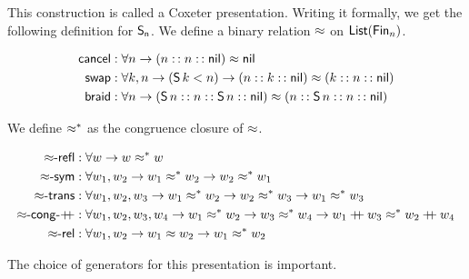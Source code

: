 
This construction is called a Coxeter presentation. Writing it formally, we get
the following definition for $\Sn$. We define a binary relation $\cox$ on
$\List[\Fin[n]]$.

\begin{definition}[$\cox$]
  \begin{align*}
    \cancel
     & : \forall n \to (n \cons n \cons \nil) \cox \nil                                                     \\
    \swap
     & : \forall k, n \to (\suc[k] < n) \to (n \cons k \cons \nil) \cox (k \cons n \cons \nil)              \\
    \braid
     & : \forall n \to (\suc[n] \cons n \cons \suc[n] \cons \nil) \cox (n \cons \suc[n] \cons n \cons \nil) \\
  \end{align*}
\end{definition}

We define $\cox*$ as the congruence closure of $\cox$.

\begin{definition}[$\cox*$]
  \begin{align*}
    \reflr{\cox}
     & : \forall w \to w \cox* w                                                                                                           \\
    \symr{\cox}
     & : \forall w_{1}, w_{2} \to w_{1} \cox* w_{2} \to w_{2} \cox* w_{1}                                                                  \\
    \transr{\cox}
     & : \forall w_{1}, w_{2}, w_{3} \to  w_{1} \cox* w_{2} \to w_{2} \cox* w_{3} \to w_{1} \cox* w_{3}                                    \\
    \congrf{\cox}{\append}
     & : \forall w_{1}, w_{2}, w_{3}, w_{4} \to  w_{1} \cox* w_{2} \to w_{3} \cox* w_{4} \to w_{1} \append w_{3} \cox* w_{2} \append w_{4} \\
    \relr{\cox}
     & : \forall w_{1}, w_{2} \to w_{1} \cox w_{2} \to w_{1} \cox* w_{2}                                                                   \\
  \end{align*}
\end{definition}

The choice of generators for this presentation is important. 

